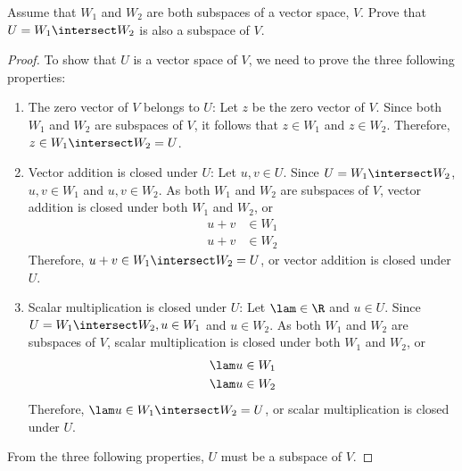 \begin{question}
    \normalfont

    Assume that $W_1$ and $W_2$ are both subspaces of a vector space, $V$. Prove that $U=W_1\intersect W_2$ is also a subspace of $V$.
\end{question}

\renewcommand\qedsymbol{$\blacksquare$}
\begin{proof}
    To show that $U$ is a vector space of $V$, we need to prove the three following properties:
    \begin{enumerate}
        \item The zero vector of $V$ belongs to $U$: Let $z$ be the zero vector of $V$. Since both $W_1$ and $W_2$ are subspaces of $V$, it follows that $z\in W_1$ and $z\in W_2$. Therefore, $z\in W_1\intersect W_2=U$.
        \item Vector addition is closed under $U$: Let $u,v\in U$. Since $U=W_1\intersect W_2$, $u,v\in W_1$ and $u,v\in W_2$. As both $W_1$ and $W_2$ are subspaces of $V$, vector addition is closed under both $W_1$ and $W_2$, or 
        \[
            \begin{aligned}
                u+v &\in W_1\\
                u+v &\in W_2
            \end{aligned}
        \]
        Therefore, $u+v\in W_1\intersect W_2=U$, or vector addition is closed under $U$.
        \item Scalar multiplication is closed under $U$: Let $\lam\in\R$ and $u\in U$. Since $U=W_1\intersect W_2, u\in W_1$ and $u\in W_2$. As both $W_1$ and $W_2$ are subspaces of $V$, scalar multiplication is closed under both $W_1$ and $W_2$, or 
        \[
            \begin{aligned}
                \lam u &\in W_1\\
                \lam u &\in W_2
            \end{aligned}
        \]
        Therefore, $\lam u\in W_1\intersect W_2=U$, or scalar multiplication is closed under $U$.
    \end{enumerate}
    From the three following properties, $U$ must be a subspace of $V$.
\end{proof}